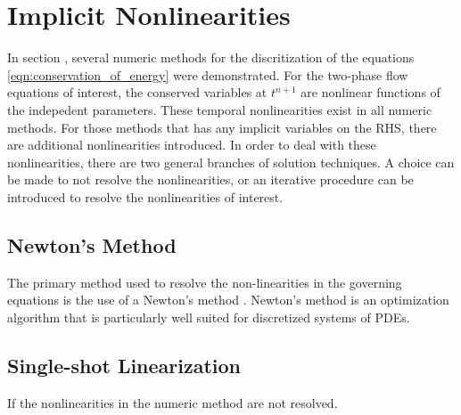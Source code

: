 \section{Implicit Nonlinearities}
\label{sect:nonlinearities}
In section , several numeric methods for the discritization of the equations \eqref{eqn:conservation_of_energy} were demonstrated.
For the two-phase flow equations of interest, the conserved variables at $t^{n+1}$ are nonlinear functions of the indepedent parameters.
These temporal nonlinearities exist in all numeric methods.
For those methods that has any implicit variables on the RHS, there are additional nonlinearities introduced.
In order to deal with these nonlinearities, there are two general branches of solution techniques.
A choice can be made to not resolve the nonlinearities, or an iterative procedure can be introduced to resolve the nonlinearities of interest.

\subsection{Newton's Method}
\label{subsect:newtons_method}
The primary method used to resolve the non-linearities in the governing equations is the use of a Newton's method \cite{Deuflhard2004}.
Newton's method is an optimization algorithm that is particularly well suited for discretized systems of PDEs.

\subsection{Single-shot Linearization}
\label{subsect:single_shot}
If the nonlinearities in the numeric method are not resolved.
